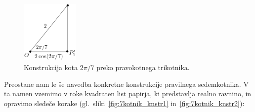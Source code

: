 \begin{figure}[h]
    \centering
    \includegraphics[width=0.25\textwidth]{images/n-kotniki/7kotnik_kot.png}
    \caption[Konstrukcija kota $2 \pi / 7$.]{Konstrukcija kota $2 \pi /7$ preko pravokotnega trikotnika.}
    \label{fig:7kotnik_kot}
\end{figure}

Preostane nam le še navedba konkretne konstrukcije pravilnega sedemkotnika. V ta namen vzemimo v roke kvadraten list papirja, ki predstavlja realno ravnino, in opravimo sledeče korake (gl.\ sliki~\ref{fig:7kotnik_knstr1} in~\ref{fig:7kotnik_knstr2}):
